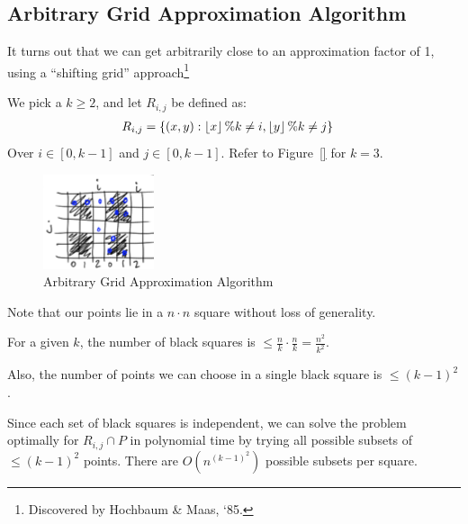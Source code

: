                 \subsection{Arbitrary Grid Approximation Algorithm} %
                \label{sub:arbitrary_grid_approximation_algorithm}
                    It turns out that we can get arbitrarily close to an approximation factor of 1, using a ``shifting grid'' approach\footnote{Discovered by Hochbaum \& Maas, `85.}

                    We pick a $k \ge 2$, and let $R_{i, j}$ be defined as:
                    \begin{align*}
                        R_{i, j} &= \{ (x, y): \left \lfloor x \right \rfloor \% k \not = i, \left \lfloor y \right \rfloor \% k \not = j \}
                    \end{align*}
                    Over $i \in [0, k-1]$ and $j \in [0, k-1]$.
                    Refer to Figure~\ref{} for $k=3$.
                    \begin{figure}[h]
                        \centering
                        \includegraphics{images/arbitrary_grid_approx_alg.png}
                        \caption{Arbitrary Grid Approximation Algorithm}
                        \label{fig:arbitrary_grid_approx_alg}
                    \end{figure}

                    Note that our points lie in a $n\cdot n$ square without loss of generality.

                    For a given $k$, the number of black squares is $\le \frac{n}{k} \cdot \frac{n}{k} = \frac{n^2}{k^2}$.

                    Also, the number of points we can choose in a single black square is $\le (k - 1)^2$.

                    Since each set of black squares is independent, we can solve the problem optimally for $R_{i,j} \cap P$ in polynomial time by trying all possible subsets of $\le (k-1)^2$ points.
                    There are $O(n^{(k-1)^2})$ possible subsets per square.


